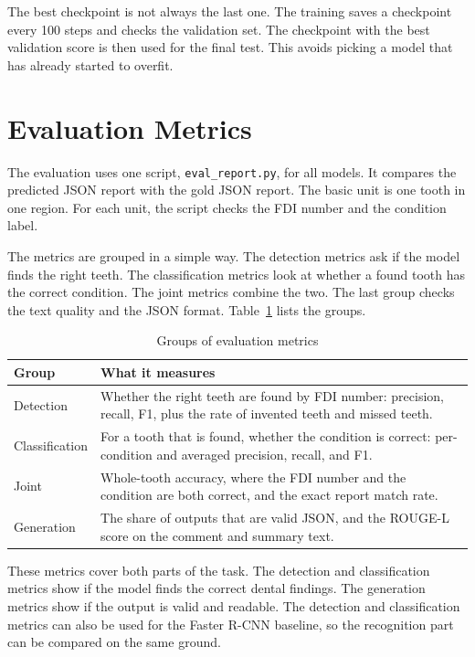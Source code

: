 \documentclass[a4paper,12pt]{report}
\begin{document}
The best checkpoint is not always the last one. The training saves a checkpoint every 100 steps and checks the validation set. The checkpoint with the best validation score is then used for the final test. This avoids picking a model that has already started to overfit.

\section{Evaluation Metrics}

The evaluation uses one script, \texttt{eval\_report.py}, for all models. It compares the predicted JSON report with the gold JSON report. The basic unit is one tooth in one region. For each unit, the script checks the FDI number and the condition label.

The metrics are grouped in a simple way. The detection metrics ask if the model finds the right teeth. The classification metrics look at whether a found tooth has the correct condition. The joint metrics combine the two. The last group checks the text quality and the JSON format. Table~\ref{tab:eval-metrics} lists the groups.

\begin{table}[H]
\centering
\caption{Groups of evaluation metrics}
\label{tab:eval-metrics}
\begin{tabular}{lp{8.5cm}}
\toprule
Group & What it measures \\
\midrule
Detection      & Whether the right teeth are found by FDI number: precision, recall, F1, plus the rate of invented teeth and missed teeth. \\
Classification & For a tooth that is found, whether the condition is correct: per-condition and averaged precision, recall, and F1. \\
Joint          & Whole-tooth accuracy, where the FDI number and the condition are both correct, and the exact report match rate. \\
Generation     & The share of outputs that are valid JSON, and the ROUGE-L score on the comment and summary text. \\
\bottomrule
\end{tabular}
\end{table}

These metrics cover both parts of the task. The detection and classification metrics show if the model finds the correct dental findings. The generation metrics show if the output is valid and readable. The detection and classification metrics can also be used for the Faster R-CNN baseline, so the recognition part can be compared on the same ground.
\end{document}
